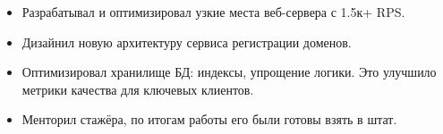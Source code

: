 \begin{itemize}
    \item Разрабатывал и оптимизировал узкие места веб-сервера с 1.5к+ RPS.
    \item Дизайнил новую архитектуру сервиса регистрации доменов.
    \item Оптимизировал хранилище БД: индексы, упрощение логики.
    Это улучшило метрики качества для ключевых клиентов.
    \item Менторил стажёра, по итогам работы его были готовы взять в штат.
\end{itemize}
